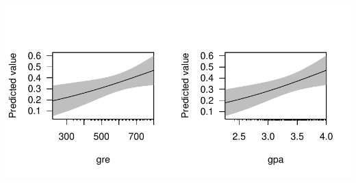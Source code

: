 \documentclass[onesided]{article}\usepackage[]{graphicx}\usepackage[]{color}
\makeatletter
\def\maxwidth{ %
  \ifdim\Gin@nat@width>\linewidth
    \linewidth
  \else
    \Gin@nat@width
  \fi
}
\newenvironment{knitrout}{}{} %
\makeatother
\begin{document}
\begin{knitrout}
{\centering \includegraphics[width=\maxwidth]{figure/sc3-1} 

}



\end{knitrout}

\end{document}
